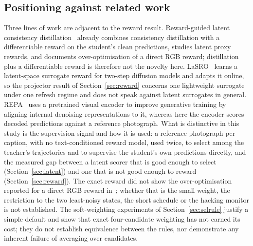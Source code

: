 \documentclass[11pt,a4paper]{article}
\begin{document}
\subsection{Positioning against related work}
Three lines of work are adjacent to the reward result. Reward-guided latent consistency distillation~\cite{rglcd} already combines consistency distillation with a differentiable reward on the student's clean predictions, studies latent proxy rewards, and documents over-optimisation of a direct RGB reward; distillation plus a differentiable reward is therefore not the novelty here. LaSRO~\cite{lasro} learns a latent-space surrogate reward for two-step diffusion models and adapts it online, so the projector result of Section~\ref{sec:reward} concerns one lightweight surrogate under one refresh regime and does not speak against latent surrogates in general. REPA~\cite{repa} uses a pretrained visual encoder to improve generative training by aligning internal denoising representations to it, whereas here the encoder scores decoded predictions against a reference photograph. What is distinctive in this study is the supervision signal and how it is used: a reference photograph per caption, with no text-conditioned reward model, used twice, to select among the teacher's trajectories and to supervise the student's own predictions directly, and the measured gap between a latent scorer that is good enough to select (Section~\ref{sec:latent}) and one that is not good enough to reward (Section~\ref{sec:reward}). The exact reward did not show the over-optimisation reported for a direct RGB reward in~\cite{rglcd}; whether that is the small weight, the restriction to the two least-noisy states, the short schedule or the hacking monitor is not established. The soft-weighting experiments of Section~\ref{sec:selrule} justify a simple default and show that exact four-candidate weighting has not earned its cost; they do not establish equivalence between the rules, nor demonstrate any inherent failure of averaging over candidates.
\end{document}
